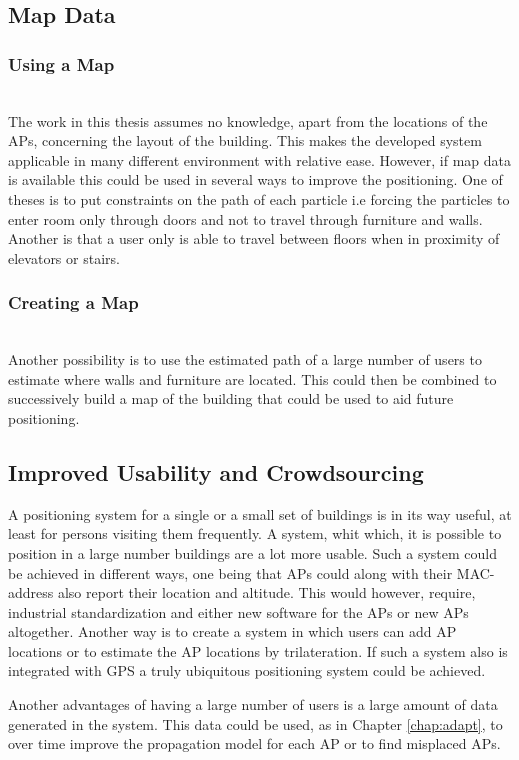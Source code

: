 \documentclass{LTHthesis}
\begin{document}
\subsection{Map Data}
\subsubsection{Using a Map}~\\
%
The work in this thesis assumes no knowledge, apart from the locations of the APs, concerning the layout of the building. This makes the developed system applicable in many different environment with relative ease. However, if map data is available this could be used in several ways to improve the positioning. One of theses is to put constraints on the path of each particle i.e forcing the particles to enter room only through doors and not to travel through furniture and walls. Another is that a user only is able to travel between floors when in proximity of elevators or stairs. 
%  
\subsubsection{Creating a Map}~\\
%
Another possibility is to use the estimated path of a large number of users to estimate where walls and furniture are located. This could then be combined to successively build a map of the building that could be used to aid future positioning. 
%
\subsection{Improved Usability and Crowdsourcing}
%
A positioning system for a single or a small set of buildings is in its way useful, at least for persons visiting them frequently. A system, whit which, it is possible to position in a large number buildings are a lot more usable. Such a system could be achieved in different ways, one being that APs could along with their MAC-address also report their location and altitude. This would however, require, industrial standardization and either new software for the APs or new APs  altogether. Another way is to create a system in which users can add AP locations or to estimate the AP locations by trilateration. If such a system also is integrated with GPS a truly ubiquitous positioning system could be achieved.

Another advantages of having a large number of users is a large amount of data generated in the system. This data could be used, as in Chapter \ref{chap:adapt}, to over time improve the propagation model for each AP or to find misplaced APs.     
%
\end{document}
